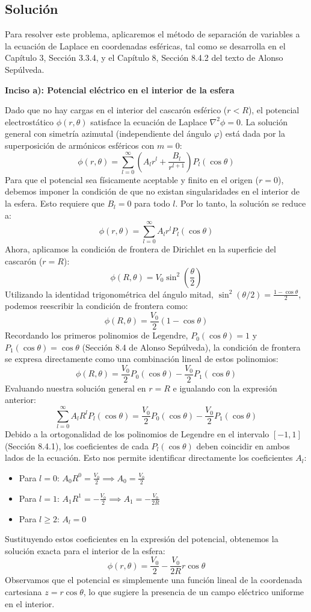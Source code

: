\documentclass[a4paper]{article}
\begin{document}
\subsection{Solución}

Para resolver este problema, aplicaremos el método de separación de variables a la ecuación de Laplace en coordenadas esféricas, tal como se desarrolla en el Capítulo 3, Sección 3.3.4, y el Capítulo 8, Sección 8.4.2 del texto de Alonso Sepúlveda.

\textbf{Inciso a): Potencial eléctrico en el interior de la esfera}

Dado que no hay cargas en el interior del cascarón esférico ($r < R$), el potencial electrostático $\phi(r, \theta)$ satisface la ecuación de Laplace $\nabla^2 \phi = 0$. La solución general con simetría azimutal (independiente del ángulo $\varphi$) está dada por la superposición de armónicos esféricos con $m=0$:
$$
\phi(r,\theta) = \sum_{l=0}^{\infty} \left( A_l r^l + \frac{B_l}{r^{l+1}} \right) P_l(\cos\theta)
$$
Para que el potencial sea físicamente aceptable y finito en el origen ($r=0$), debemos imponer la condición de que no existan singularidades en el interior de la esfera. Esto requiere que $B_l = 0$ para todo $l$. Por lo tanto, la solución se reduce a:
$$
\phi(r,\theta) = \sum_{l=0}^{\infty} A_l r^l P_l(\cos\theta)
$$
Ahora, aplicamos la condición de frontera de Dirichlet en la superficie del cascarón ($r=R$):
$$
\phi(R,\theta) = V_0 \sin^2\left(\frac{\theta}{2}\right)
$$
Utilizando la identidad trigonométrica del ángulo mitad, $\sin^2(\theta/2) = \frac{1 - \cos\theta}{2}$, podemos reescribir la condición de frontera como:
$$
\phi(R,\theta) = \frac{V_0}{2} (1 - \cos\theta)
$$
Recordando los primeros polinomios de Legendre, $P_0(\cos\theta) = 1$ y $P_1(\cos\theta) = \cos\theta$ (Sección 8.4 de Alonso Sepúlveda), la condición de frontera se expresa directamente como una combinación lineal de estos polinomios:
$$
\phi(R,\theta) = \frac{V_0}{2} P_0(\cos\theta) - \frac{V_0}{2} P_1(\cos\theta)
$$
Evaluando nuestra solución general en $r=R$ e igualando con la expresión anterior:
$$
\sum_{l=0}^{\infty} A_l R^l P_l(\cos\theta) = \frac{V_0}{2} P_0(\cos\theta) - \frac{V_0}{2} P_1(\cos\theta)
$$
Debido a la ortogonalidad de los polinomios de Legendre en el intervalo $[-1, 1]$ (Sección 8.4.1), los coeficientes de cada $P_l(\cos\theta)$ deben coincidir en ambos lados de la ecuación. Esto nos permite identificar directamente los coeficientes $A_l$:
\begin{itemize}
\item Para $l=0$: $A_0 R^0 = \frac{V_0}{2} \implies A_0 = \frac{V_0}{2}$
\item Para $l=1$: $A_1 R^1 = -\frac{V_0}{2} \implies A_1 = -\frac{V_0}{2R}$
\item Para $l \ge 2$: $A_l = 0$
\end{itemize}
Sustituyendo estos coeficientes en la expresión del potencial, obtenemos la solución exacta para el interior de la esfera:
$$
\phi(r,\theta) = \frac{V_0}{2} - \frac{V_0}{2R} r \cos\theta
$$
Observamos que el potencial es simplemente una función lineal de la coordenada cartesiana $z = r\cos\theta$, lo que sugiere la presencia de un campo eléctrico uniforme en el interior.
\end{document}
